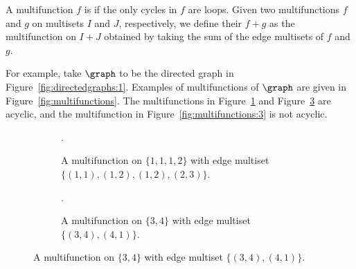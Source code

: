 A multifunction \(f\) is  if the only cycles in \(f\) are loops.
Given two multifunctions \(f\) and \(g\) on multisets \(I\) and \(J\), respectively, we define their  \(f + g\) as the multifunction on \(I + J\) obtained by taking the sum of the edge multisets of \(f\) and \(g\).

For example, take \(\graph\) to be the directed graph in Figure~\ref{fig:directedgraphs:1}.
Examples of multifunctions of \(\graph\) are given in Figure~\ref{fig:multifunctions}.
The multifunctions in Figure~\ref{fig:multifunctions:1} and Figure~\ref{fig:multifunctions:2} are acyclic, and the multifunction in Figure~\ref{fig:multifunctions:3} is not acyclic.

\begin{figure}[htpb]
    \centering
    \begin{subfigure}[t]{0.29\textwidth}
        \centering
        .
        \caption{A multifunction on \(\{1,\allowbreak 1,\allowbreak 1,\allowbreak 2\}\) with edge multiset \(\{(1, 1),\allowbreak (1, 2),\allowbreak (1, 2),\allowbreak (2, 3)\}\).}
        \label{fig:multifunctions:1}
    \end{subfigure}
    \hfill
    \begin{subfigure}[t]{0.28\textwidth}
        \centering
        .
        \caption{A multifunction on \(\{3,\allowbreak 4\}\) with edge multiset \(\{(3, 4),\allowbreak (4, 1)\}\).}
        \label{fig:multifunctions:2}
    \end{subfigure}

\end{figure}
